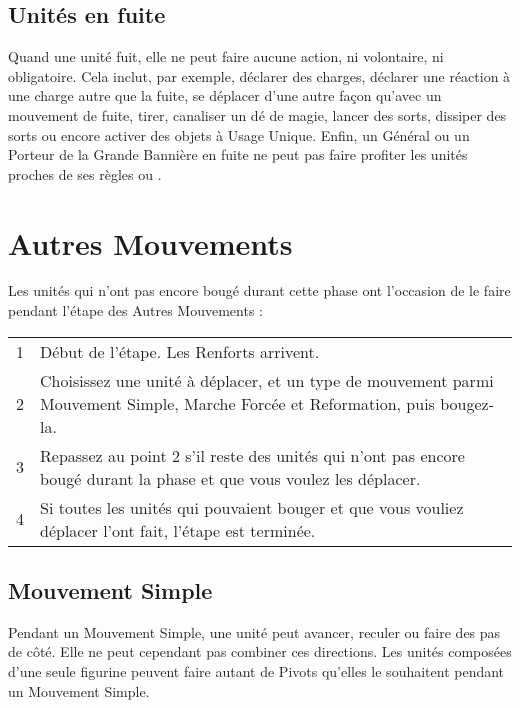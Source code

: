 \subsection{Unités en fuite}

Quand une unité fuit, elle ne peut faire aucune action, ni volontaire, ni obligatoire. Cela inclut, par exemple, déclarer des charges, déclarer une réaction à une charge autre que la fuite, se déplacer d'une autre façon qu'avec un mouvement de fuite, tirer, canaliser un dé de magie, lancer des sorts, dissiper des sorts ou encore activer des objets à Usage Unique. Enfin, un Général ou un Porteur de la Grande Bannière en fuite ne peut pas faire profiter les unités proches de ses règles \inspiringpresence{} ou \holdyourground{}.


\section{Autres Mouvements}

Les unités qui n'ont pas encore bougé durant cette phase ont l'occasion de le faire pendant l'étape des Autres Mouvements :

\hspace*{0.3cm}
\begin{tabular}{c|m{12cm}}
1 & Début de l'étape. Les Renforts arrivent.\tabularnewline
2 & Choisissez une unité à déplacer, et un type de mouvement parmi Mouvement Simple, Marche Forcée et Reformation, puis bougez-la.\tabularnewline
3 & Repassez au point 2 s'il reste des unités qui n'ont pas encore bougé durant la phase et que vous voulez les déplacer.\tabularnewline
4 & Si toutes les unités qui pouvaient bouger et que vous vouliez déplacer l'ont fait, l'étape est terminée.\tabularnewline
\end{tabular}

\subsection{Mouvement Simple}

Pendant un Mouvement Simple, une unité peut avancer, reculer ou faire des pas de côté. Elle ne peut cependant pas combiner ces directions. Les unités composées d'une seule figurine peuvent faire autant de Pivots qu'elles le souhaitent pendant un Mouvement Simple. 

